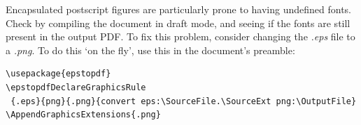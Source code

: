 Encapsulated postscript figures are particularly prone to having undefined fonts. Check by compiling the document in draft mode, and seeing if the fonts are still present in the output PDF. To fix this problem, consider changing the \emph{.eps} file to a \emph{.png}. To do this `on the fly', use this in the document's preamble:

\begin{verbatim}
\usepackage{epstopdf}
\epstopdfDeclareGraphicsRule
 {.eps}{png}{.png}{convert eps:\SourceFile.\SourceExt png:\OutputFile}
\AppendGraphicsExtensions{.png}
\end{verbatim}